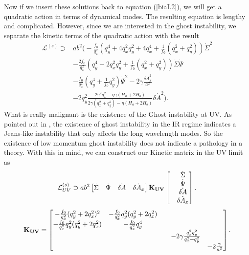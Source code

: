 \documentclass[%
 reprint,
 amsmath,amssymb,
 aps,
]{revtex4-1}
\begin{document}
Now if we insert these solutions back to equation (\ref{biaL2}), we will get a quadratic action in terms of dynamical modes. The resulting equation is lengthy and complicated. However, since we are interested in the ghost instability, we separate the kinetic terms of the quadratic action with the result
\begin{equation}\label{biakin}
\begin{split}
\mathcal{L}^{(s)}\supset& ab^2\biggl(-\frac{f_0}{q_x^2}(q_y^4+4q_x^2q_y^2+4q_x^4+\frac{1}{f_0}(q_x^2+q_y^2))\dot{\Sigma}^2\\
&-\frac{2f_0}{q_x^2}(q_y^4+2q_x^2q_y^2+\frac{1}{f_0}(q_x^2+q_y^2))\dot{\Sigma}\dot{\Psi}\\
&-\frac{f_0}{q_x^2}(q_y^4+\frac{1}{f_0}q_y^2)\dot{\Psi}^2-2\gamma\frac{\delta\dot{A}_x^2}{a^2}\\
&-2q_y^2\frac{2\gamma^2 q_x^2-\eta\gamma(H_a+2H_b)}{2\gamma(q_x^2+q_y^2)-\eta(H_a+2H_b)}\delta\dot{A}^2\biggr).
\end{split}
\end{equation}
What is really malignant is the existence of the Ghost instability at UV. As pointed out in \cite{Gumrukcuoglu:2016jbh, Emami:2016ldl}, the existence of ghost instability in the IR regime indicates a Jeans-like instability that only affects the long wavelength modes. So the existence of low momentum ghost instability does not indicate a pathology in a theory. With this in mind, we can construct our Kinetic matrix in the UV limit as
\begin{equation}
\mathcal{L}^{(s)}_{UV}\supset ab^2
\begin{bmatrix}
\dot{\Sigma}    & \dot{\Psi }  &\dot{\delta A}      &\dot{\delta A_x}
\end{bmatrix}
\bold{K_{UV}}
\begin{bmatrix}
&\dot{\Sigma}\\
&\dot{\Psi}\\
&\dot{\delta A}\\
&\dot{\delta A_x}
\end{bmatrix}.
\end{equation}
\begin{equation}
\bold{K_{UV}}=\begin{bmatrix}
-\frac{f_0}{q_x^2}(q_y^2+2q_x^2)^2   & -\frac{f_0}{q_x^2}q_y^2(q_y^2+2q_x^2)  &     &   \\
-\frac{f_0}{q_x^2}q_y^2(q_y^2+2q_x^2)    &-\frac{f_0}{q_x^2}q_y^4 &    &  \\
&     &     &-2\gamma\frac{q_x^2q_y^2}{q_x^2+q_y^2}  &  \\
&     &     &      &-2\frac{\gamma}{a^2}
\end{bmatrix}.
\end{equation}
\end{document}
